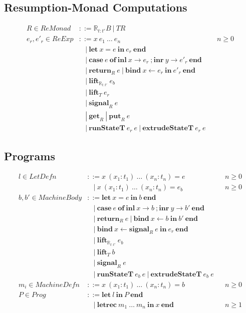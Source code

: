 \documentclass{article}[11pt]
\begin{document}
\subsection{Resumption-Monad Computations}
$$
\begin{aligned}
R \in \mathit{ReMonad} &::= \mathbb{R}_{t:t'} B~ |~ T R\\
e_r,e'_r \in \mathit{ReExp} &::= x~ e_1~ \dots~ e_n&&n \ge 0\\
  &~~~~|~ \mathbf{let}~ x = e~ \mathbf{in}~ e_r~ \mathbf{end}\\
  &~~~~|~ \mathbf{case}~ e~ \mathbf{of}~ \mathbf{inl}~ x \rightarrow e_r~ ; \mathbf{inr}~ y \rightarrow e'_r~ \mathbf{end}\\
  &~~~~|~ \mathbf{return}_R~ e~ |~ \mathbf{bind}~ x \leftarrow{} e_r~ \mathbf{in}~ e'_r~ \mathbf{end}\\
  &~~~~|~ \mathbf{lift}_{\mathbb{R}_{t:t'}}~ e_b\\
  &~~~~|~ \mathbf{lift}_T~ e_r\\
  &~~~~|~ \mathbf{signal}_R~ e\\
  &~~~~|~ \mathbf{get}_R~ |~ \mathbf{put}_R~ e\\
  &~~~~|~ \mathbf{runStateT}~ e_r~ e~ |~ \mathbf{extrudeStateT}~ e_r~ e
\end{aligned}
$$

\subsection{Programs}
$$
\begin{aligned}
l \in \mathit{LetDefn}&::= x~ (x_1 : t_1)~ \dots~ (x_n : t_n) = e&&n \ge 0\\
  &~~~~|~ x~ (x_1 : t_1)~ \dots~ (x_n : t_n) = e_b&&n \ge 0\\
b,b' \in \mathit{MachineBody}&::= \mathbf{let}~ x = e~ \mathbf{in}~ b~ \mathbf{end}\\
  &~~~~|~ \mathbf{case}~ e~ \mathbf{of}~ \mathbf{inl}~ x \rightarrow b~ ; \mathbf{inr}~ y \rightarrow b'~ \mathbf{end}\\
  &~~~~|~ \mathbf{return}_R~ e~ |~ \mathbf{bind}~ x \leftarrow{} b~ \mathbf{in}~ b'~ \mathbf{end}\\
  &~~~~|~ \mathbf{bind}~ x \leftarrow{} \mathbf{signal}_R~ e~ \mathbf{in}~ e_r~ \mathbf{end}\\
  &~~~~|~ \mathbf{lift}_{\mathbb{R}_{t:t'}}~ e_b\\
  &~~~~|~ \mathbf{lift}_T~ b\\
  &~~~~|~ \mathbf{signal}_R~ e\\
  &~~~~|~ \mathbf{runStateT}~ e_b~ e~ |~ \mathbf{extrudeStateT}~ e_b~ e\\
m_i \in \mathit{MachineDefn}&::= x~ (x_1 : t_1)~ \dots~ (x_n : t_n) = b&&n \ge 0\\
P \in \mathit{Prog}&::= \mathbf{let}~ l~ \mathbf{in}~ P~ \mathbf{end}\\
  &~~~~|~ \mathbf{letrec}~ m_1~ \dots~ m_n~ \mathbf{in}~ x~ \mathbf{end}&&n \ge 1
\end{aligned}
$$
\end{document}
